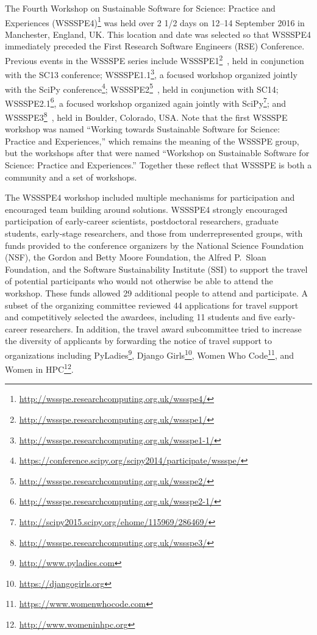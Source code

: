 \documentclass[11pt, oneside]{amsart}
\newcommand{\todo}[1]{{\color{blue}$\blacksquare$~\textsf{[TODO: #1]}}}
\begin{document}
The Fourth Workshop on Sustainable Software for Science: Practice and Experiences
(WSSSPE4)\footnote{\url{http://wssspe.researchcomputing.org.uk/wssspe4/}} was
held over 2 1/2 days on 12--14 September 2016 in Manchester, England, UK.
This location and date was selected so that WSSSPE4 immediately preceded the
First Research Software Engineers (RSE) Conference.
Previous events in the WSSSPE series include
WSSSPE1\footnote{\url{http://wssspe.researchcomputing.org.uk/wssspe1/}}~\cite{WSSSPE1-pre-report,WSSSPE1},
held in conjunction with the SC13 conference;
WSSSPE1.1\footnote{\url{http://wssspe.researchcomputing.org.uk/wssspe1-1/}}, a
focused workshop organized jointly with the SciPy
conference\footnote{\url{https://conference.scipy.org/scipy2014/participate/wssspe/}};
WSSSPE2\footnote{\url{http://wssspe.researchcomputing.org.uk/wssspe2/}}~\cite{WSSSPE2-pre-report,WSSSPE2},
held in conjunction with SC14;
WSSSPE2.1\footnote{\url{http://wssspe.researchcomputing.org.uk/wssspe2-1/}}, a
focused workshop organized again jointly with
SciPy\footnote{\url{http://scipy2015.scipy.org/ehome/115969/286469/}};
and WSSSPE3\footnote{\url{http://wssspe.researchcomputing.org.uk/wssspe3/}}~\cite{WSSSPE3},
held in Boulder, Colorado, USA.
Note that the first WSSSPE workshop was named
``Working towards
Sustainable Software for Science: Practice and Experiences,'' which remains the meaning
of the WSSSPE group, but the workshops after that were named
``Workshop on Sustainable
Software for Science: Practice and Experiences.'' Together these reflect
that WSSSPE is both a community and a set of workshops.


The WSSSPE4 workshop included multiple mechanisms for participation and
encouraged team building around solutions. WSSSPE4 strongly encouraged participation
of early-career scientists, postdoctoral researchers, graduate students,
early-stage researchers, and those from underrepresented groups,
with funds provided to the conference organizers by the National Science
Foundation (NSF), the Gordon and Betty Moore Foundation, the Alfred P.~Sloan Foundation, and the Software
Sustainability Institute (SSI) to support the travel of potential participants
who would not otherwise be able to attend the workshop. These
funds allowed 29 additional people to attend and participate. A subset of the
organizing committee reviewed 44 applications for travel support and
competitively selected the awardees, including 11 students and five early-career
researchers. In addition, the travel award subcommittee tried to increase the
diversity of applicants by forwarding the notice of travel support to
organizations including PyLadies\footnote{\url{http://www.pyladies.com}},
Django Girls\footnote{\url{https://djangogirls.org}},
Women Who Code\footnote{\url{https://www.womenwhocode.com}}, and
Women in HPC\footnote{\url{http://www.womeninhpc.org}}.
\end{document}
